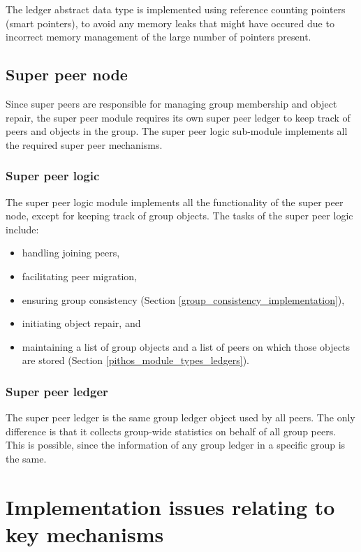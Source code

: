 The ledger abstract data type is implemented using reference counting pointers (smart pointers), to avoid any memory leaks that might have occured due to incorrect memory management of the large number of pointers present.

\subsection{Super peer node}
\label{pithos_module_types_sp_logic}

Since super peers are responsible for managing group membership and object repair, the super peer module requires its own super peer ledger to keep track of peers and objects in the group. The super peer logic sub-module implements all the required super peer mechanisms.

\subsubsection{Super peer logic}
The super peer logic module implements all the functionality of the super peer node, except for keeping track of group objects. The tasks of the super peer logic include:
\begin{itemize}
\item handling joining peers,
\item facilitating peer migration,
\item ensuring group consistency (Section \ref{group_consistency_implementation}),
\item initiating object repair, and
\item maintaining a list of group objects and a list of peers on which those objects are stored (Section \ref{pithos_module_types_ledgers}).
\end{itemize}

\subsubsection{Super peer ledger}

The super peer ledger is the same group ledger object used by all peers. The only difference is that it collects group-wide statistics on behalf of all group peers. This is possible, since the information of any group ledger in a specific group is the same.

\section{Implementation issues relating to key mechanisms}
\label{key_mechanisms}

